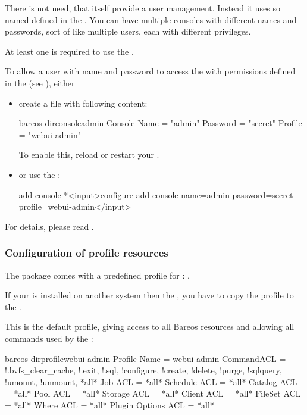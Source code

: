 There is not need, that \bareosWebui itself provide a user management.
Instead it uses so named  defined in the \bareosDir.
You can have multiple consoles with different names and passwords, sort of like multiple users, each with different privileges.

At least one  is required to use the \bareosWebui.

To allow a user with name  and password  to access the \bareosDir
with permissions defined in the  (see ),
either
\begin{itemize}
\item create a file  with following content:
\begin{bareosConfigResource}{bareos-dir}{console}{admin}
Console {
  Name = "admin"
  Password = "secret"
  Profile = "webui-admin"
}
\end{bareosConfigResource}

To enable this, reload or restart your \bareosDir.
\item or use the :
\begin{bconsole}{add console}
*<input>configure add console name=admin password=secret profile=webui-admin</input>
\end{bconsole}
\end{itemize}


For details, please read .



\subsubsection{Configuration of profile resources}
    \label{sec:webui-profile}

The package  comes with a predefined profile for \bareosWebui: .

If your \bareosWebui is installed on another system then the \bareosDir, you have to copy the profile to the \bareosDir.

This is the default profile, giving access to all Bareos resources and allowing all commands used by the \bareosWebui:

\begin{bareosConfigResource}{bareos-dir}{profile}{webui-admin}
Profile {
  Name = webui-admin
  CommandACL = !.bvfs_clear_cache, !.exit, !.sql, !configure, !create, !delete, !purge, !sqlquery, !umount, !unmount, *all*
  Job ACL = *all*
  Schedule ACL = *all*
  Catalog ACL = *all*
  Pool ACL = *all*
  Storage ACL = *all*
  Client ACL = *all*
  FileSet ACL = *all*
  Where ACL = *all*
  Plugin Options ACL = *all*
}
\end{bareosConfigResource}

